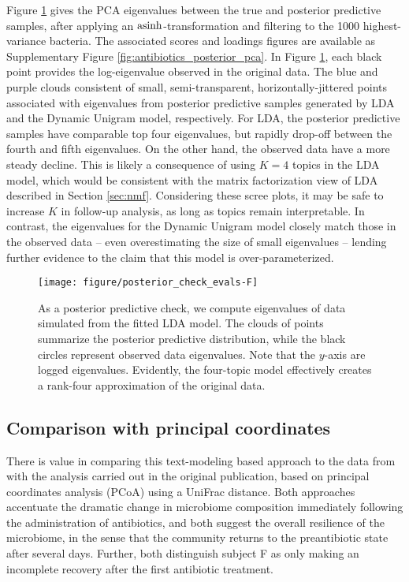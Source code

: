 \documentclass[oupdraft]{bio}
\begin{document}
Figure \ref{fig:antibiotics_posterior_evals} gives the PCA eigenvalues between
the true and posterior predictive samples, after applying an
$\mathop\mathrm{asinh}$-transformation and filtering to the 1000 highest-variance bacteria. The
associated scores and loadings figures are available as Supplementary Figure
\ref{fig:antibiotics_posterior_pca}. In Figure
\ref{fig:antibiotics_posterior_evals}, each black point provides the
log-eigenvalue observed in the original data. The blue and purple clouds
consistent of small, semi-transparent, horizontally-jittered points associated
with eigenvalues from posterior predictive samples generated by LDA and the
Dynamic Unigram model, respectively. For LDA, the posterior predictive samples
have comparable top four eigenvalues, but rapidly drop-off between the fourth
and fifth eigenvalues. On the other hand, the observed data have a more steady
decline. This is likely a consequence of using $K = 4$ topics in the LDA model,
which would be consistent with the matrix factorization view of LDA described in
Section \ref{sec:nmf}. Considering these scree plots, it may be safe to increase
$K$ in follow-up analysis, as long as topics remain interpretable. In contrast,
the eigenvalues for the Dynamic Unigram model closely match those in the
observed data -- even overestimating the size of small eigenvalues -- lending
further evidence to the claim that this model is over-parameterized.

\begin{figure}[!p]
  \centering
  \texttt{[image: figure/posterior\_check\_evals-F]}
  \caption{As a posterior predictive check, we compute eigenvalues of data
    simulated from the fitted LDA model. The clouds of points summarize the
    posterior predictive distribution, while the black circles represent
    observed data eigenvalues. Note that the $y$-axis are logged eigenvalues.
    Evidently, the four-topic model effectively creates a rank-four
    approximation of the original data. \label{fig:antibiotics_posterior_evals}}
\end{figure}


\subsection{Comparison with principal coordinates}
\label{subsec:comparison_with_pcoa}

There is value in comparing this text-modeling based approach to the data from
\citep{dethlefsen2011incomplete} with the analysis carried out in the original
publication, based on principal coordinates analysis (PCoA) using a UniFrac
distance. Both approaches accentuate the dramatic change in microbiome
composition immediately following the administration of antibiotics, and both
suggest the overall resilience of the microbiome, in the sense that the
community returns to the preantibiotic state after several days. Further, both
distinguish subject F as only making an incomplete recovery after the first
antibiotic treatment.
\end{document}
